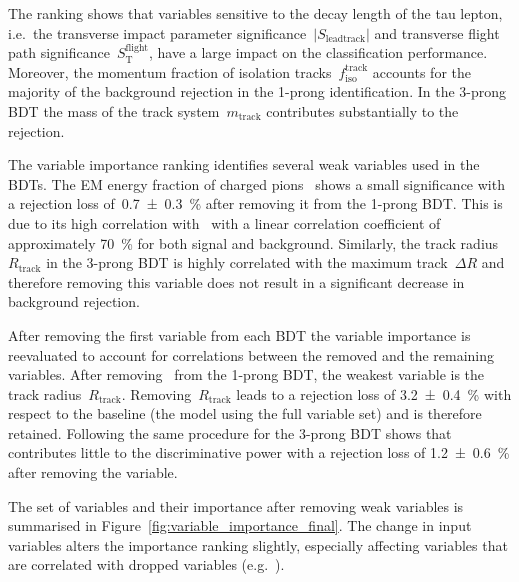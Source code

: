 The ranking shows that variables sensitive to the decay length of the tau
lepton, i.e.\ the transverse impact parameter
significance~$|S_\text{leadtrack}|$ and transverse flight path
significance~$S_\text{T}^\text{flight}$, have a large impact on the
classification performance. Moreover, the momentum fraction of isolation
tracks~$f_\text{iso}^\text{track}$ accounts for the majority of the background
rejection in the 1-prong identification. In the 3-prong BDT the mass of the
track system~$m_\text{track}$ contributes substantially to the rejection.

The variable importance ranking identifies several weak variables used in the
BDTs. The EM energy fraction of charged
pions~ shows a small significance with a
rejection loss of~\SI{0.7 +- 0.3}{\percent} after removing it from the 1-prong
BDT. This is due to its high correlation
with~ with a linear correlation
coefficient of approximately \SI{70}{\percent} for both signal and background.
Similarly, the track radius~$R_\text{track}$ in the 3-prong BDT is highly
correlated with the maximum track~$\Delta R$ and therefore removing this
variable does not result in a significant decrease in background rejection.

After removing the first variable from each BDT the variable importance is
reevaluated to account for correlations between the removed and the remaining
variables. After removing~ from the
1-prong BDT, the weakest variable is the track radius~$R_\text{track}$.
Removing~$R_\text{track}$ leads to a rejection loss of \SI{3.2 +- 0.4}{\percent}
with respect to the baseline (the model using the full variable set) and is
therefore retained. Following the same procedure for the 3-prong BDT shows
that~ contributes little to the
discriminative power with a rejection loss of \SI{1.2 +- 0.6}{\percent} after
removing the variable.

The set of variables and their importance after removing weak variables is
summarised in Figure~\ref{fig:variable_importance_final}. The change in input
variables alters the importance ranking slightly, especially affecting variables
that are correlated with dropped variables (e.g.\
).

